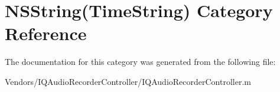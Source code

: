 \hypertarget{category_n_s_string_07_time_string_08}{}\section{N\+S\+String(Time\+String) Category Reference}
\label{category_n_s_string_07_time_string_08}


The documentation for this category was generated from the following file\+:\begin{DoxyCompactItemize}
\item 
Vendors/\+I\+Q\+Audio\+Recorder\+Controller/I\+Q\+Audio\+Recorder\+Controller.\+m\end{DoxyCompactItemize}
